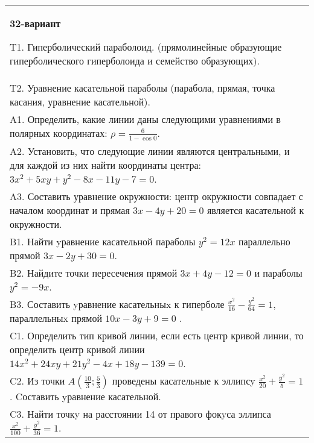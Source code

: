 \documentclass{article}
\begin{document}
\begin{tabular}{m{17cm}}
\textbf{32-вариант}
\newline

T1. Гиперболический параболоид. (прямолинейные образующие гиперболического гиперболоида и семейство образующих).\\

T2. Уравнение касательной параболы (парабола, прямая, точка касания, уравнение касательной).\\

A1. Определить, какие линии даны следующими уравнениями в полярных координатах: $\rho=\frac{6}{1-\cos 0}$.\\

A2. Установить, что следующие линии являются центральными, и для каждой из них найти координаты центра: $3x^{2}+5xy+y^{2}-8x-11y-7=0$.\\

A3. Составить уравнение окружности: центр окружности совпадает с началом координат и прямая $3x-4y+20=0$ является касательной к окружности.\\

B1. Найти yравнение касательной параболы $y^{2} = 12x$ параллельно прямой $3x - 2y + 30 = 0$.  \\

B2. Найдите точки пересечения прямой $3x + 4y - 12 = 0$ и параболы $y^{2} = - 9x$.  \\

B3. Составить yравнение касательныx к гиперболе $\frac{x^{2}}{16} - \frac{y^{2}}{64} = 1$, параллельныx прямой $10x - 3y + 9 = 0$ .  \\

C1. Определить тип кривой линии, если есть центр кривой линии, то определить центр кривой линии $14x^{2}+24xy+21y^{2}-4x+18y-139=0$.  \\

C2. Из точки $A(\frac{10}{3};\frac{5}{3})$ проведены касательные к эллипсy $\frac{x^{2}}{20}+\frac{y^{2}}{5}=1$ . Cоставить yравнение касательной.  \\

C3. Найти точкy на расстоянии 14 от правого фокyса эллипса $\frac{x^{2}}{100}+\frac{y^{2}}{36}=1$.\\

\end{tabular}
\vspace{1cm}
\end{document}
